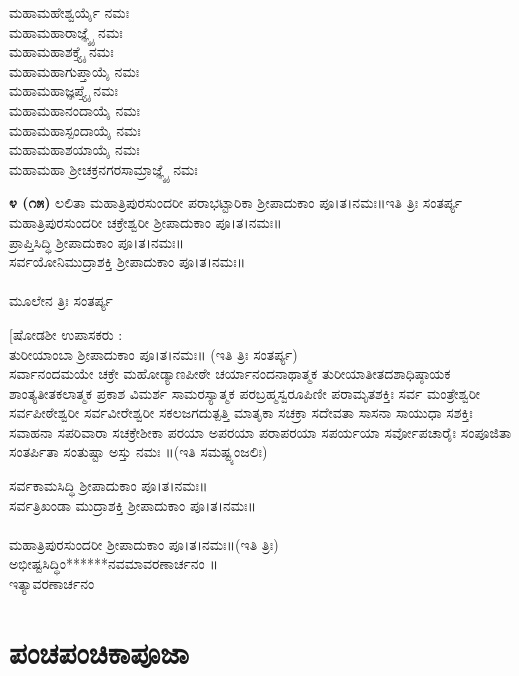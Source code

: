  ಮಹಾಮಹೇಶ್ವರ್ಯೈ ನಮಃ\\
 ಮಹಾಮಹಾರಾಜ್ಞ್ಯೈ ನಮಃ\\
 ಮಹಾಮಹಾಶಕ್ತ್ಯೈ ನಮಃ\\
 ಮಹಾಮಹಾಗುಪ್ತಾಯೈ ನಮಃ\\
 ಮಹಾಮಹಾಜ್ಞಪ್ತ್ಯೈ ನಮಃ\\
 ಮಹಾಮಹಾನಂದಾಯೈ ನಮಃ\\
 ಮಹಾಮಹಾಸ್ಪಂದಾಯೈ ನಮಃ\\
 ಮಹಾಮಹಾಶಯಾಯೈ ನಮಃ\\
 ಮಹಾಮಹಾ ಶ್ರೀಚಕ್ರನಗರಸಾಮ್ರಾಜ್ಞ್ಯೈ ನಮಃ

{\bfseries ೪ (೧೫)} ಲಲಿತಾ ಮಹಾತ್ರಿಪುರಸುಂದರೀ ಪರಾಭಟ್ಟಾರಿಕಾ ಶ್ರೀಪಾದುಕಾಂ ಪೂ।ತ।ನಮಃ॥ಇತಿ ತ್ರಿಃ ಸಂತರ್ಪ್ಯ\\
ಮಹಾತ್ರಿಪುರಸುಂದರೀ ಚಕ್ರೇಶ್ವರೀ ಶ್ರೀಪಾದುಕಾಂ ಪೂ।ತ।ನಮಃ॥\\
 ಪ್ರಾಪ್ತಿಸಿದ್ಧಿ ಶ್ರೀಪಾದುಕಾಂ ಪೂ।ತ।ನಮಃ॥\\
 ಸರ್ವಯೋನಿಮುದ್ರಾಶಕ್ತಿ ಶ್ರೀಪಾದುಕಾಂ ಪೂ।ತ।ನಮಃ॥\\
\\
ಮೂಲೇನ ತ್ರಿಃ ಸಂತರ್ಪ್ಯ

[ಷೋಡಶೀ ಉಪಾಸಕರು :\\
 ತುರೀಯಾಂಬಾ ಶ್ರೀಪಾದುಕಾಂ ಪೂ।ತ।ನಮಃ॥ (ಇತಿ ತ್ರಿಃ ಸಂತರ್ಪ್ಯ)\\
 ಸರ್ವಾನಂದಮಯೇ ಚಕ್ರೇ ಮಹೋಡ್ಯಾಣಪೀಠೇ ಚರ್ಯಾನಂದನಾಥಾತ್ಮಕ ತುರೀಯಾತೀತದಶಾಧಿಷ್ಠಾಯಕ ಶಾಂತ್ಯತೀತಕಲಾತ್ಮಕ ಪ್ರಕಾಶ ವಿಮರ್ಶ ಸಾಮರಸ್ಯಾತ್ಮಕ ಪರಬ್ರಹ್ಮಸ್ವರೂಪಿಣೀ ಪರಾಮೃತಶಕ್ತಿಃ ಸರ್ವ ಮಂತ್ರೇಶ್ವರೀ ಸರ್ವಪೀಠೇಶ್ವರೀ ಸರ್ವವೀರೇಶ್ವರೀ ಸಕಲಜಗದುತ್ಪತ್ತಿ ಮಾತೃಕಾ ಸಚಕ್ರಾ ಸದೇವತಾ ಸಾಸನಾ ಸಾಯುಧಾ ಸಶಕ್ತಿಃ ಸವಾಹನಾ ಸಪರಿವಾರಾ ಸಚಕ್ರೇಶೀಕಾ ಪರಯಾ ಅಪರಯಾ ಪರಾಪರಯಾ ಸಪರ್ಯಯಾ ಸರ್ವೋಪಚಾರೈಃ ಸಂಪೂಜಿತಾ ಸಂತರ್ಪಿತಾ ಸಂತುಷ್ಟಾ ಅಸ್ತು ನಮಃ ॥(ಇತಿ ಸಮಷ್ಟ್ಯಂಜಲಿಃ)

 ಸರ್ವಕಾಮಸಿದ್ಧಿ ಶ್ರೀಪಾದುಕಾಂ ಪೂ।ತ।ನಮಃ॥\\
 ಸರ್ವತ್ರಿಖಂಡಾ ಮುದ್ರಾಶಕ್ತಿ ಶ್ರೀಪಾದುಕಾಂ ಪೂ।ತ।ನಮಃ॥\\
\\
 ಮಹಾತ್ರಿಪುರಸುಂದರೀ ಶ್ರೀಪಾದುಕಾಂ ಪೂ।ತ।ನಮಃ॥(ಇತಿ ತ್ರಿಃ)\\
 ಅಭೀಷ್ಟಸಿದ್ಧಿಂ******ನವಮಾವರಣಾರ್ಚನಂ ॥\\
ಇತ್ಯಾವರಣಾರ್ಚನಂ
\section{ಪಂಚಪಂಚಿಕಾಪೂಜಾ}
